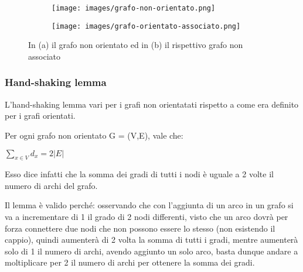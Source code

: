 \begin{figure}[h!]
    \centering
    \begin{subfigure}{.3\textwidth}
        \centering
        \texttt{[image: images/grafo-non-orientato.png]}
        \vspace{-5pt}
        \caption{}
    \end{subfigure}
    \hspace{1cm}
    \begin{subfigure}{.3\textwidth}
        \centering
        \texttt{[image: images/grafo-orientato-associato.png]}
        \vspace{-5pt}
        \caption{}
    \end{subfigure}
    \caption{In (a) il grafo non orientato ed in (b) il rispettivo grafo non associato}
\end{figure}

\subsubsection{Hand-shaking lemma}
L'hand-shaking lemma vari per i grafi non orientatati rispetto a come era definito per i grafi orientati.
\begin{lemma}
    Per ogni grafo non orientato G = (V,E), vale che:
    \begin{center}
        $\sum\limits_{x \in V}d_x = 2|E|$
    \end{center}
    Esso dice infatti che la somma dei gradi di tutti i nodi è uguale a 2 volte il numero di archi del grafo. 
\end{lemma}
Il lemma è valido perché: osservando che con l'aggiunta di un arco in un grafo si va a incrementare di 1 il grado di 2 nodi differenti, visto che un arco dovrà per forza connettere due nodi che non possono essere lo stesso (non esistendo il cappio), quindi aumenterà di 2 volta la somma di tutti i gradi, mentre aumenterà solo di 1 il numero di archi, avendo aggiunto un solo arco, basta dunque andare a moltiplicare per 2 il numero di archi per ottenere la somma dei gradi.

